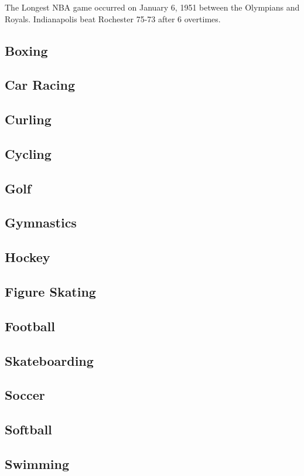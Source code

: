 			The Longest NBA game occurred on January 6, 1951 between the Olympians and Royals. Indianapolis beat Rochester 75-73 after 6 overtimes.
			
			
		
		\newpage		
		\subsection{Boxing}
		\subsection{Car Racing}
		\subsection{Curling}
		\subsection{Cycling}
		\subsection{Golf}
		\subsection{Gymnastics}
		\subsection{Hockey}
		\subsection{Figure Skating}
		\subsection{Football}
		\subsection{Skateboarding}		
		\subsection{Soccer}
		\subsection{Softball}
		\subsection{Swimming}

